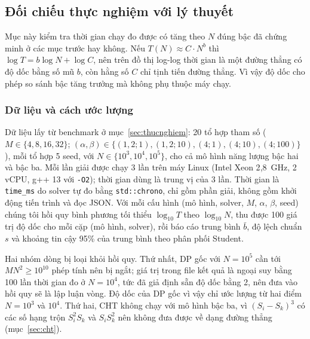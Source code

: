 
\subsection{Đối chiếu thực nghiệm với lý thuyết}
\label{sec:kiemchung}

Mục này kiểm tra thời gian chạy đo được có tăng theo $N$ đúng bậc đã chứng minh ở các mục trước hay không.
Nếu $T(N) \approx C \cdot N^{b}$ thì $\log T = b \log N + \log C$, nên trên đồ thị log-log thời gian là
một đường thẳng có độ dốc bằng số mũ $b$, còn hằng số $C$ chỉ tịnh tiến đường thẳng.
Vì vậy độ dốc cho phép so sánh bậc tăng trưởng mà không phụ thuộc máy chạy.

\subsubsection{Dữ liệu và cách ước lượng}
Dữ liệu lấy từ benchmark ở mục~\ref{sec:thucnghiem}: 20 tổ hợp tham số
($M \in \{4, 8, 16, 32\}$; $(\alpha, \beta) \in \{(1{,}2; 1), (1{,}2; 10), (4; 1), (4; 10), (4; 100)\}$),
mỗi tổ hợp 5 seed, với $N \in \{10^3, 10^4, 10^5\}$, cho cả mô hình năng lượng bậc hai và bậc ba.
Mỗi lần giải được chạy 3 lần trên máy Linux (Intel Xeon 2{,}8~GHz, 2 vCPU, g++ 13 với \texttt{-O2});
thời gian dùng là trung vị của 3 lần.
Thời gian là \texttt{time\_ms} do solver tự đo bằng \texttt{std::chrono}, chỉ gồm phần giải,
không gồm khởi động tiến trình và đọc JSON.
Với mỗi cấu hình (mô hình, solver, $M$, $\alpha$, $\beta$, seed) chúng tôi hồi quy bình phương tối thiểu
$\log_{10} T$ theo $\log_{10} N$, thu được 100 giá trị độ dốc cho mỗi cặp (mô hình, solver),
rồi báo cáo trung bình $\bar b$, độ lệch chuẩn $s$ và khoảng tin cậy 95\% của trung bình theo phân phối Student.

Hai nhóm dòng bị loại khỏi hồi quy.
Thứ nhất, DP gốc với $N = 10^5$ cần tới $M N^2 \ge 10^{10}$ phép tính nên bị ngắt;
giá trị trong file kết quả là ngoại suy bằng 100 lần thời gian đo ở $N = 10^4$,
tức đã giả định sẵn độ dốc bằng 2, nên đưa vào hồi quy sẽ là lập luận vòng.
Độ dốc của DP gốc vì vậy chỉ ước lượng từ hai điểm $N = 10^3$ và $10^4$.
Thứ hai, CHT không chạy với mô hình bậc ba, vì $(S_i - S_k)^3$ có các số hạng trộn
$S_i^2 S_k$ và $S_i S_k^2$ nên không đưa được về dạng đường thẳng (mục~\ref{sec:cht}).

